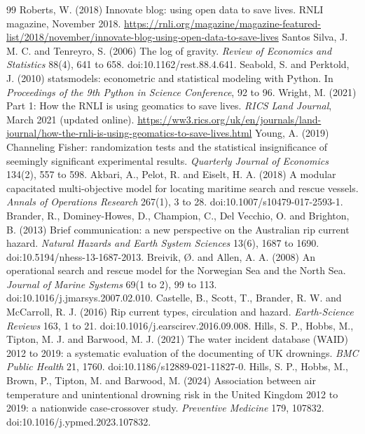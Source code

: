 \documentclass[11pt,a4paper]{article}
\begin{document}
\begin{thebibliography}{99}
 Roberts, W. (2018) Innovate blog: using open data to save lives. RNLI magazine, November 2018. \url{https://rnli.org/magazine/magazine-featured-list/2018/november/innovate-blog-using-open-data-to-save-lives}
 Santos Silva, J. M. C. and Tenreyro, S. (2006) The log of gravity. \textit{Review of Economics and Statistics} 88(4), 641 to 658. doi:10.1162/rest.88.4.641.
 Seabold, S. and Perktold, J. (2010) statsmodels: econometric and statistical modeling with Python. In \textit{Proceedings of the 9th Python in Science Conference}, 92 to 96.
 Wright, M. (2021) Part 1: How the RNLI is using geomatics to save lives. \textit{RICS Land Journal}, March 2021 (updated online). \url{https://ww3.rics.org/uk/en/journals/land-journal/how-the-rnli-is-using-geomatics-to-save-lives.html}
 Young, A. (2019) Channeling Fisher: randomization tests and the statistical insignificance of seemingly significant experimental results. \textit{Quarterly Journal of Economics} 134(2), 557 to 598.
 Akbari, A., Pelot, R. and Eiselt, H. A. (2018) A modular capacitated multi-objective model for locating maritime search and rescue vessels. \textit{Annals of Operations Research} 267(1), 3 to 28. doi:10.1007/s10479-017-2593-1.
 Brander, R., Dominey-Howes, D., Champion, C., Del Vecchio, O. and Brighton, B. (2013) Brief communication: a new perspective on the Australian rip current hazard. \textit{Natural Hazards and Earth System Sciences} 13(6), 1687 to 1690. doi:10.5194/nhess-13-1687-2013.
 Breivik, \O. and Allen, A. A. (2008) An operational search and rescue model for the Norwegian Sea and the North Sea. \textit{Journal of Marine Systems} 69(1 to 2), 99 to 113. doi:10.1016/j.jmarsys.2007.02.010.
 Castelle, B., Scott, T., Brander, R. W. and McCarroll, R. J. (2016) Rip current types, circulation and hazard. \textit{Earth-Science Reviews} 163, 1 to 21. doi:10.1016/j.earscirev.2016.09.008.
 Hills, S. P., Hobbs, M., Tipton, M. J. and Barwood, M. J. (2021) The water incident database (WAID) 2012 to 2019: a systematic evaluation of the documenting of UK drownings. \textit{BMC Public Health} 21, 1760. doi:10.1186/s12889-021-11827-0.
 Hills, S. P., Hobbs, M., Brown, P., Tipton, M. and Barwood, M. (2024) Association between air temperature and unintentional drowning risk in the United Kingdom 2012 to 2019: a nationwide case-crossover study. \textit{Preventive Medicine} 179, 107832. doi:10.1016/j.ypmed.2023.107832.

\end{thebibliography}
\end{document}

